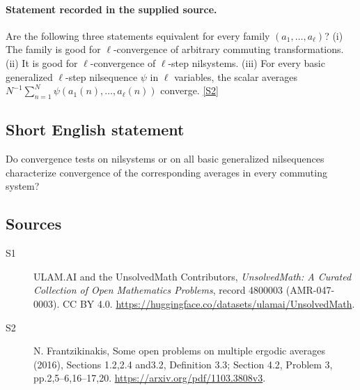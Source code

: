 \documentclass[11pt]{article}
\newcommand{\sref}[2]{\hyperlink{source:#1:#2}{[S#2]}}
\begin{document}
\paragraph{Statement recorded in the supplied source.}
Are the following three statements equivalent for every family $(a_1,\ldots,a_\ell)$? (i) The family is good for $\ell$-convergence of arbitrary commuting transformations. (ii) It is good for $\ell$-convergence of $\ell$-step nilsystems. (iii) For every basic generalized $\ell$-step nilsequence $\psi$ in $\ell$ variables, the scalar averages $N^{-1}\sum_{n=1}^N\psi(a_1(n),\ldots,a_\ell(n))$ converge. \sref{4800003}{2}
\subsection{Short English statement}
Do convergence tests on nilsystems or on all basic generalized nilsequences characterize convergence of the corresponding averages in every commuting system?
\subsection{Sources}
\begin{description}
\item[\hypertarget{source:4800003:1}{S1}] ULAM.AI and the UnsolvedMath Contributors, \emph{UnsolvedMath: A Curated Collection of Open Mathematics Problems}, record 4800003 (AMR-047-0003). CC BY 4.0. \url{https://huggingface.co/datasets/ulamai/UnsolvedMath}.
\item[\hypertarget{source:4800003:2}{S2}] N. Frantzikinakis, Some open problems on multiple ergodic averages (2016), Sections 1.2,2.4 and3.2, Definition 3.3; Section 4.2, Problem 3, pp.2,5--6,16--17,20. \url{https://arxiv.org/pdf/1103.3808v3}.
\end{description}
\label{end:4800003}
\end{document}
